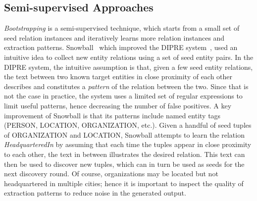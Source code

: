 \subsection{Semi-supervised Approaches}
\textit{Bootstrapping} is a semi-supervised technique, which starts from a small set of seed relation instances and iteratively learns more relation instances and extraction patterns.
Snowball~\cite{agichtein2000snowball} which improved the DIPRE system~\cite{brin1998extracting}, used an intuitive idea to collect new entity relations using a set of seed entity pairs.
In the DIPRE system, the intuitive assumption is that, given a few seed entity relations, the text between two known target entities in close proximity of each other describes and constitutes a \textit{pattern} of the relation between the two. 
Since that is not the case in practice, the system uses a limited set of regular expressions to limit useful patterns, hence decreasing the number of false positives.
A key improvement of Snowball
is that its patterns include named entity tags (PERSON, LOCATION, ORGANIZATION, etc.).
Given a handful of seed tuples of ORGANIZATION and LOCATION, Snowball attempts to learn the relation \textit{HeadquarteredIn} by assuming that each time the tuples appear in close proximity to each other, 
the text in between illustrates the desired relation.
This text can then be used to discover new tuples, which can in turn be used as seeds for the next discovery round.
Of course, organizations may be located but not headquartered in multiple cities;
hence it is important to inspect the quality of extraction patterns to reduce noise in the generated output.


